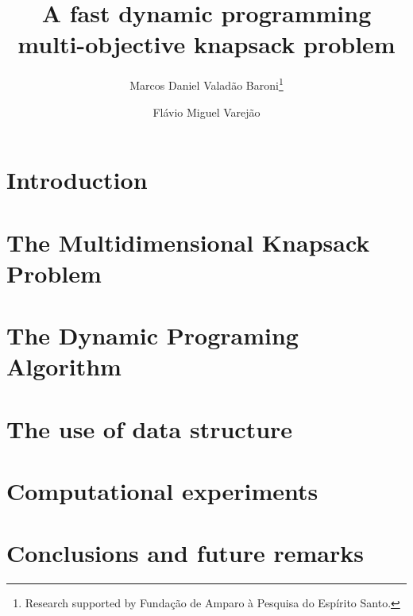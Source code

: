 \documentclass{article}
\begin{document}
\title{A fast dynamic programming multi-objective knapsack problem}

\author{
   Marcos Daniel Valad\~ao Baroni\thanks{Research supported by Funda\c c\~ao de Amparo \`a Pesquisa do Esp\'irito Santo.}
   \and
   Fl\'avio Miguel Varej\~ao
}





\maketitle

\begin{abstract}

\end{abstract}

\section{Introduction}
\label{sec:intro}


\section{The Multidimensional Knapsack Problem}
\label{sec:mokp}


\section{The Dynamic Programing Algorithm}
\label{sec:mokp}


\section{The use of data structure}
\label{sec:kdtree}


\section{Computational experiments}
\label{sec:exp}


\section{Conclusions and future remarks}
\label{sec:conc}


%

\end{document}
